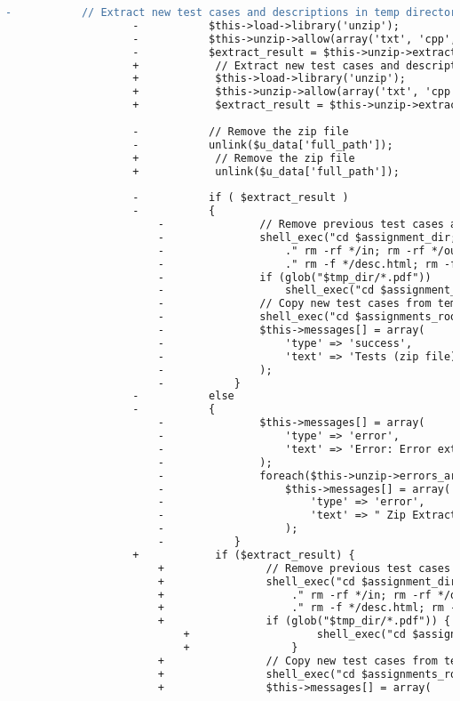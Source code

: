 \begin{lstlisting}[language=diff, caption=Perubahan pada kode Assignments.php]
					-			// Extract new test cases and descriptions in temp directory
					-			$this->load->library('unzip');
					-			$this->unzip->allow(array('txt', 'cpp', 'html', 'md', 'pdf'));
					-			$extract_result = $this->unzip->extract($u_data['full_path'], $tmp_dir);
					+            // Extract new test cases and descriptions in temp directory
					+            $this->load->library('unzip');
					+            $this->unzip->allow(array('txt', 'cpp', 'html', 'md', 'pdf'));
					+            $extract_result = $this->unzip->extract($u_data['full_path'], $tmp_dir);
					
					-			// Remove the zip file
					-			unlink($u_data['full_path']);
					+            // Remove the zip file
					+            unlink($u_data['full_path']);
					
					-			if ( $extract_result )
					-			{
						-				// Remove previous test cases and descriptions
						-				shell_exec("cd $assignment_dir;"
						-					." rm -rf */in; rm -rf */out; rm -f */tester.cpp; rm -f */tester.executable;"
						-					." rm -f */desc.html; rm -f */desc.md; rm -f */*.pdf;");
						-				if (glob("$tmp_dir/*.pdf"))
						-					shell_exec("cd $assignment_dir; rm -f *.pdf");
						-				// Copy new test cases from temp dir
						-				shell_exec("cd $assignments_root; cp -R $tmp_dir_name/* assignment_{$the_id};");
						-				$this->messages[] = array(
						-					'type' => 'success',
						-					'text' => 'Tests (zip file) extracted successfully.'
						-				);
						-			}
					-			else
					-			{
						-				$this->messages[] = array(
						-					'type' => 'error',
						-					'text' => 'Error: Error extracting zip archive.'
						-				);
						-				foreach($this->unzip->errors_array() as $msg)
						-					$this->messages[] = array(
						-						'type' => 'error',
						-						'text' => " Zip Extraction Error: ".$msg
						-					);
						-			}
					+            if ($extract_result) {
						+                // Remove previous test cases and descriptions
						+                shell_exec("cd $assignment_dir;"
						+                    ." rm -rf */in; rm -rf */out; rm -f */tester.cpp; rm -f */tester.executable;"
						+                    ." rm -f */desc.html; rm -f */desc.md; rm -f */*.pdf;");
						+                if (glob("$tmp_dir/*.pdf")) {
							+                    shell_exec("cd $assignment_dir; rm -f *.pdf");
							+                }
						+                // Copy new test cases from temp dir
						+                shell_exec("cd $assignments_root; cp -R $tmp_dir_name/* assignment_{$the_id};");
						+                $this->messages[] = array(

\end{lstlisting}

